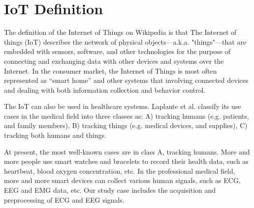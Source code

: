 \documentclass[11pt, oneside]{article}   	%
\begin{document}
\section{IoT Definition}
\indent \par The definition of the Internet of Things on Wikipedia is that The Internet of things (IoT) describes the network of physical objects—a.k.a. "things"—that are embedded with sensors, software, and other technologies for the purpose of connecting and exchanging data with other devices and systems over the Internet\cite{ref16}. In the consumer market, the Internet of Things is most often represented as “smart home” and other systems that involving connected devices and dealing with both information collection and behavior control. \\
\indent \par The IoT can also be used in healthcare systems. Laplante et al.\cite{ref17} classify its use cases in the medical field into three classes as: A) tracking humans (e.g. patients, and family members), B) tracking things (e.g. medical devices, and supplies), C) tracking both humans and things. \\
\indent \par At present, the most well-known cases are in class A, tracking humans. More and more people use smart watches and bracelets to record their health data, such as heartbeat, blood oxygen concentration, etc. In the professional medical field, more and more smart devices can collect various human signals, such as ECG, EEG and EMG data, etc. Our study case includes the acquisition and preprocessing of ECG and EEG signals.
\end{document}

